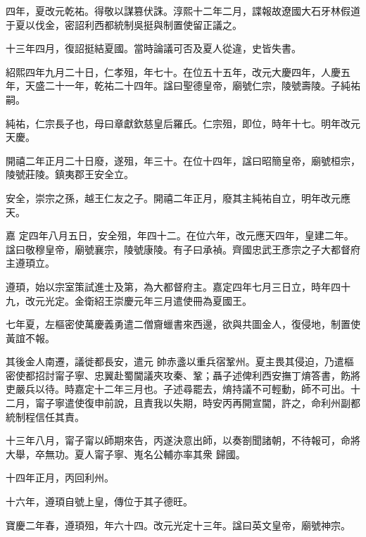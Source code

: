 \begin{pinyinscope}
 四年，夏改元乾祐。得敬以謀篡伏誅。淳熙十二年二月，諜報故遼國大石牙林假道于夏以伐金，密詔利西都統制吳挺與制置使留正議之。



 十三年四月，復詔挺結夏國。當時論議可否及夏人從違，史皆失書。



 紹熙四年九月二十日，仁孝殂，年七十。在位五十五年，改元大慶四年，人慶五年，天盛二十一年，乾祐二十四年。諡曰聖德皇帝，廟號仁宗，陵號壽陵。子純祐嗣。



 純祐，仁宗長子也，母曰章獻欽慈皇后羅氏。仁宗殂，即位，時年十七。明年改元天慶。



 開禧二年正月二十日廢，遂殂，年三十。在位十四年，諡曰昭簡皇帝，廟號桓宗，陵號莊陵。鎮夷郡王安全立。



 安全，崇宗之孫，越王仁友之子。開禧二年正月，廢其主純祐自立，明年改元應天。



 嘉
 定四年八月五日，安全殂，年四十二。在位六年，改元應天四年，皇建二年。諡曰敬穆皇帝，廟號襄宗，陵號康陵。有子曰承禎。齊國忠武王彥宗之子大都督府主遵頊立。



 遵頊，始以宗室策試進士及第，為大都督府主。嘉定四年七月三日立，時年四十九，改元光定。金衛紹王崇慶元年三月遣使冊為夏國王。



 七年夏，左樞密使萬慶義勇遣二僧齎蠟書來西邊，欲與共圖金人，復侵地，制置使黃誼不報。



 其後金人南遷，議徙都長安，遣元
 帥赤盞以重兵宿鞏州。夏主畏其侵迫，乃遣樞密使都招討甯子寧、忠翼赴蜀閫議夾攻秦、鞏；聶子述俾利西安撫丁焴答書，飭將吏嚴兵以待。時嘉定十二年三月也。子述尋罷去，焴持議不可輕動，師不可出。十二月，甯子寧遣使復申前說，且責我以失期，時安丙再開宣閫，許之，命利州副都統制程信任其責。



 十三年八月，甯子甯以師期來告，丙遂決意出師，以奏劄聞諸朝，不待報可，命將大舉，卒無功。夏人甯子寧、嵬名公輔亦率其衆
 歸國。



 十四年正月，丙回利州。



 十六年，遵頊自號上皇，傳位于其子德旺。



 寶慶二年春，遵頊殂，年六十四。改元光定十三年。諡曰英文皇帝，廟號神宗。




\end{pinyinscope}
